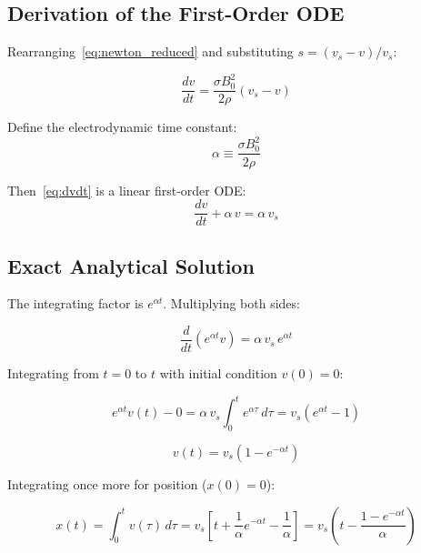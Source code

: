 \documentclass[12pt, a4paper]{article}
\theoremstyle{plain}
\theoremstyle{definition}
\newcommand{\sig}{\sigma}
\begin{document}
\subsection{Derivation of the First-Order ODE}

Rearranging~\eqref{eq:newton_reduced} and substituting $s = (v_s - v)/v_s$:

\begin{equation}
  \frac{dv}{dt} = \frac{\sig B_0^2}{2\rho}(v_s - v)
  \label{eq:dvdt}
\end{equation}

Define the electrodynamic time constant:
\begin{equation}
  \alpha \equiv \frac{\sig B_0^2}{2\rho}
  \label{eq:alpha}
\end{equation}

Then~\eqref{eq:dvdt} is a linear first-order ODE:
\begin{equation}
  \frac{dv}{dt} + \alpha\,v = \alpha\,v_s
  \label{eq:ode_v}
\end{equation}

\subsection{Exact Analytical Solution}

The integrating factor is $e^{\alpha t}$. Multiplying both sides:

\begin{equation}
  \frac{d}{dt}\left(e^{\alpha t} v\right) = \alpha\,v_s\,e^{\alpha t}
\end{equation}

Integrating from $t=0$ to $t$ with initial condition $v(0) = 0$:

\begin{equation}
  e^{\alpha t} v(t) - 0 = \alpha\,v_s \int_0^t e^{\alpha\tau}\,d\tau
  = v_s\left(e^{\alpha t} - 1\right)
\end{equation}

\begin{tcolorbox}[colback=green!5, colframe=green!50,
  title=\textbf{Exact Velocity Solution}]
\begin{equation}
  \boxed{v(t) = v_s\left(1 - e^{-\alpha t}\right)}
  \label{eq:vt}
\end{equation}
\end{tcolorbox}

Integrating once more for position ($x(0) = 0$):

\begin{equation}
  x(t) = \int_0^t v(\tau)\,d\tau
        = v_s\left[t + \frac{1}{\alpha}e^{-\alpha t} - \frac{1}{\alpha}\right]
        = v_s\left(t - \frac{1-e^{-\alpha t}}{\alpha}\right)
  \label{eq:xt}
\end{equation}
\end{document}
